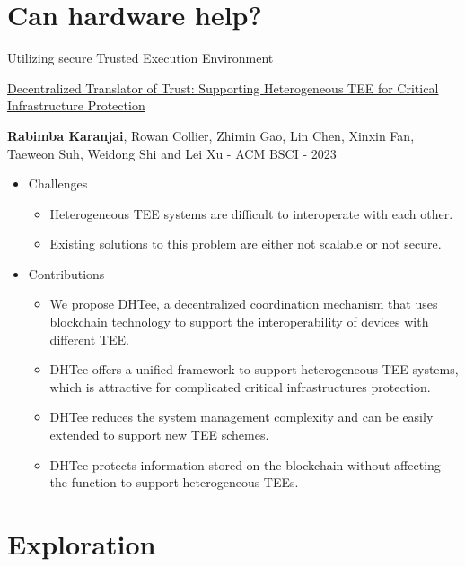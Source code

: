 \documentclass[10pt,aspectratio=169]{beamer}
\begin{document}
\section{Can hardware help?}

\begin{frame}[fragile]{Utilizing secure Trusted Execution Environment}

{\href{https://camps.aptaracorp.com/ACM_PMS/PMS/ACM/BSCI23/14/7b4e9185-e3b1-11ed-b37c-16bb50361d1f/OUT/bsci23-14.html}{\underline{Decentralized Translator of Trust: Supporting Heterogeneous TEE for Critical Infrastructure Protection}}} 

{\textbf{Rabimba Karanjai}, Rowan Collier, Zhimin Gao, Lin Chen, Xinxin Fan, Taeweon Suh, Weidong Shi and Lei Xu} - {ACM BSCI} - {2023}

\begin{itemize}
\item Challenges
  \begin{itemize}
    \item Heterogeneous TEE systems are difficult to interoperate with each other.
    \item Existing solutions to this problem are either not scalable or not secure.
  \end{itemize}
\item Contributions
  \begin{itemize}
    \item We propose DHTee, a decentralized coordination mechanism that uses blockchain technology to support the interoperability of devices with different TEE.
    \item DHTee offers a unified framework to support heterogeneous TEE systems, which is attractive for complicated critical infrastructures protection.
    \item DHTee reduces the system management complexity and can be easily extended to support new TEE schemes.
    \item DHTee protects information stored on the blockchain without affecting the function to support heterogeneous TEEs.
  \end{itemize}
\end{itemize}

\end{frame}

\section{Exploration}
\end{document}
